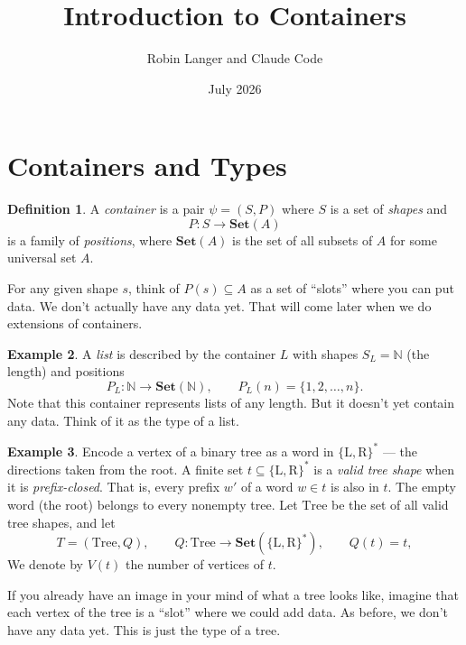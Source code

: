 \documentclass[11pt, a4paper]{article}
\title{Introduction to Containers}
\author{Robin Langer and Claude Code}
\date{July 2026}
\theoremstyle{definition}
\newtheorem{definition}{Definition}[section]
\newtheorem{example}[definition]{Example}
\theoremstyle{plain}
\begin{document}
\maketitle

\section{Containers and Types}

\noindent\colorbox{gray!15}{\parbox{\dimexpr\linewidth-2\fboxsep}{%
\begin{definition}
A \emph{container} is a pair $\psi = (S, P)$ where $S$ is a set of \emph{shapes} and
\[
  P : S \to \mathbf{Set}(A)
\]
is a family of \emph{positions}, where $\mathbf{Set}(A)$ is the set of all
subsets of $A$ for some universal set $A$.

For any given shape $s$, think of $P(s) \subseteq A$ as a set of
``slots'' where you can put data.  We don't actually have any data
yet.  That will come later when we do extensions of containers.
\end{definition}%
}}

\begin{example}\label{ex:list}
A \emph{list} is described by
the container $L$ with shapes $S_L = \mathbb{N}$ (the length) and positions
\[
  P_L : \mathbb{N} \to \mathbf{Set}(\mathbb{N}), \qquad
  P_L(n) = \{1, 2, \ldots, n\}.
\]
Note that this container represents lists of
any length.  But it doesn't yet contain any data.  Think of it as
the type of a list.
\end{example}

\begin{example}\label{ex:tree}
Encode a vertex of a binary tree as a word in
$\{\mathrm{L}, \mathrm{R}\}^*$ --- the directions taken from the
root.  A finite set $t \subseteq \{\mathrm{L}, \mathrm{R}\}^*$ is a
\emph{valid tree shape} when it is
\emph{prefix-closed}.  That is, every prefix $w'$ of a word
$w \in t$ is also in $t$.  The empty word (the root) belongs to every nonempty
tree.  Let $\mathrm{Tree}$ be the set of all valid tree shapes, and let
\[
  T = (\mathrm{Tree}, Q), \qquad
  Q : \mathrm{Tree} \to \mathbf{Set}(\{\mathrm{L},\mathrm{R}\}^*),
  \qquad Q(t) = t,
\]
We denote by $V(t)$ the number of vertices of $t$.

If you already have an image in your mind of what a tree looks
like, imagine that each vertex of the tree is a ``slot'' where we
could add data.  As before, we don't have any data yet.  This is
just the type of a tree.
\end{example}
\end{document}
